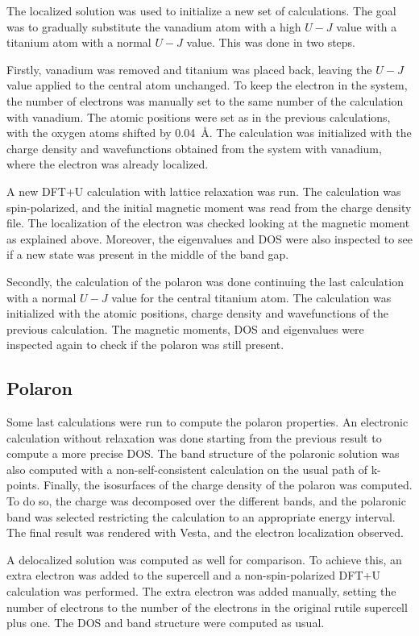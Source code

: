 The localized solution was used to initialize a new set of calculations. The goal was to gradually substitute the vanadium atom with a high $U-J$ value with a titanium atom with a normal $U-J$ value. This was done in two steps.

Firstly, vanadium was removed and titanium was placed back, leaving
the $U-J$ value applied to the central atom unchanged. To keep the electron in the system, the number of electrons was manually set to the same number of the calculation with vanadium. The atomic positions were set as in the previous calculations, with the oxygen atoms shifted by \SI{0.04}{\angstrom}. The calculation was initialized with the charge density and wavefunctions obtained from the system with vanadium, where the electron was already localized.

A new DFT+U calculation with lattice relaxation was run. The calculation was spin-polarized, and the initial magnetic moment was read from the charge density file. The localization of the electron was checked looking at the magnetic moment as explained above. Moreover, the eigenvalues and DOS were also inspected to see if a new state was present in the middle of the band gap.

Secondly, the calculation of the polaron was done continuing the last calculation with a normal $U-J$ value for the central titanium atom. The calculation was initialized with the atomic positions, charge density and wavefunctions of the previous calculation. The magnetic moments, DOS and eigenvalues were inspected again to check if the polaron was still present.

\subsection{Polaron}

Some last calculations were run to compute the polaron properties. An electronic calculation without relaxation was done starting from the previous result to compute a more precise DOS. The band structure of the polaronic solution was also computed with a non-self-consistent calculation on the usual path of k-points. Finally, the isosurfaces of the charge density of the polaron was computed. To do so, the charge was decomposed over the different bands, and the polaronic band was selected restricting the calculation to an appropriate energy interval. The final result was rendered with Vesta, and the electron localization observed.

A delocalized solution was computed as well for comparison. To achieve this, an extra electron was added to the supercell and a non-spin-polarized DFT+U calculation was performed. The extra electron was added manually, setting the number of electrons to the number of the electrons in the original rutile supercell plus one. The DOS and band structure were computed as usual.